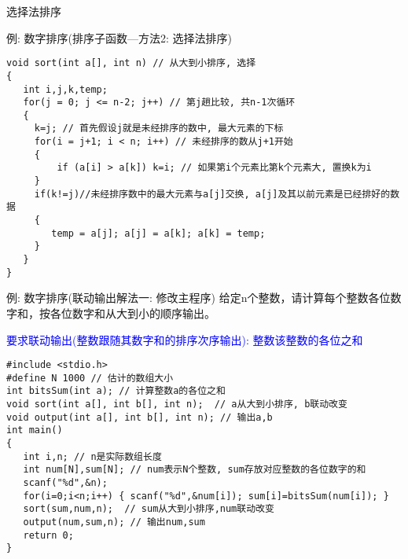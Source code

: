 \begin{frame}{选择法排序}
\end{frame}


\begin{frame}{例: 数字排序(排序子函数---方法2: 选择法排序)}
\vspace{-0.3cm}
\begin{lstlisting}
void sort(int a[], int n) // 从大到小排序, 选择
{
   int i,j,k,temp;
   for(j = 0; j <= n-2; j++) // 第j趟比较, 共n-1次循环
   {
     k=j; // 首先假设j就是未经排序的数中, 最大元素的下标
     for(i = j+1; i < n; i++) // 未经排序的数从j+1开始
     {
         if (a[i] > a[k]) k=i; // 如果第i个元素比第k个元素大, 置换k为i
     }
     if(k!=j)//未经排序数中的最大元素与a[j]交换, a[j]及其以前元素是已经排好的数据
     { 
        temp = a[j]; a[j] = a[k]; a[k] = temp; 
     }
   }
}
\end{lstlisting}
\end{frame}

\begin{frame}{例: 数字排序(联动输出解法一: 修改主程序)}
\vspace{-0.2cm}
给定n个整数，请计算每个整数各位数字和，按各位数字和从大到小的顺序输出。

\textcolor{blue}{要求联动输出(整数跟随其数字和的排序次序输出): 整数\quad 该整数的各位之和}
\vspace{-0.2cm}
\begin{lstlisting}
#include <stdio.h>
#define N 1000 // 估计的数组大小
int bitsSum(int a); // 计算整数a的各位之和
void sort(int a[], int b[], int n);  // a从大到小排序, b联动改变
void output(int a[], int b[], int n); // 输出a,b
int main()
{
   int i,n; // n是实际数组长度 
   int num[N],sum[N]; // num表示N个整数, sum存放对应整数的各位数字的和  
   scanf("%d",&n);
   for(i=0;i<n;i++) { scanf("%d",&num[i]); sum[i]=bitsSum(num[i]); }
   sort(sum,num,n);  // sum从大到小排序,num联动改变
   output(num,sum,n); // 输出num,sum
   return 0;
}
\end{lstlisting}
\end{frame}

